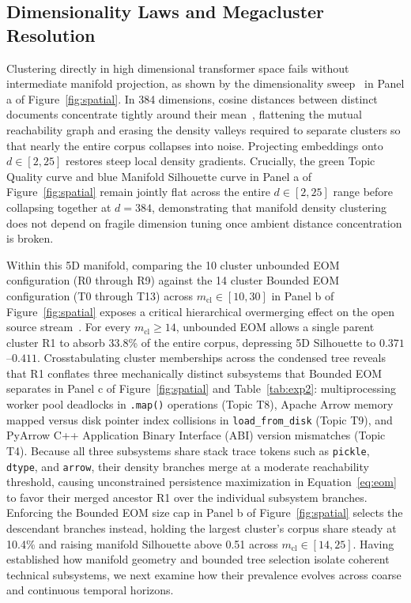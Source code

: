 \documentclass[sigconf,anonymous,pbalance]{acmart}
\begin{document}
\subsection{Dimensionality Laws and Megacluster Resolution}
Clustering directly in high dimensional transformer space fails without intermediate manifold projection, as shown by the dimensionality sweep~\cite{mcinnes2018umap} in Panel a of Figure~\ref{fig:spatial}. In 384 dimensions, cosine distances between distinct documents concentrate tightly around their mean~\cite{beyer1999nearest}, flattening the mutual reachability graph and erasing the density valleys required to separate clusters so that nearly the entire corpus collapses into noise. Projecting embeddings onto $d \in [2, 25]$ restores steep local density gradients. Crucially, the green Topic Quality curve and blue Manifold Silhouette curve in Panel a of Figure~\ref{fig:spatial} remain jointly flat across the entire $d \in [2, 25]$ range before collapsing together at $d = 384$, demonstrating that manifold density clustering does not depend on fragile dimension tuning once ambient distance concentration is broken.

Within this 5D manifold, comparing the 10 cluster unbounded EOM configuration (R0 through R9) against the 14 cluster Bounded EOM configuration (T0 through T13) across $m_{\text{cl}} \in [10, 30]$ in Panel b of Figure~\ref{fig:spatial} exposes a critical hierarchical overmerging effect on the open source stream~\cite{lhoest2021datasets}. For every $m_{\text{cl}} \ge 14$, unbounded EOM allows a single parent cluster R1 to absorb 33.8\% of the entire corpus, depressing 5D Silhouette to $0.371$--$0.411$. Crosstabulating cluster memberships across the condensed tree reveals that R1 conflates three mechanically distinct subsystems that Bounded EOM separates in Panel c of Figure~\ref{fig:spatial} and Table~\ref{tab:exp2}: multiprocessing worker pool deadlocks in \texttt{.map()} operations (Topic T8), Apache Arrow memory mapped versus disk pointer index collisions in \texttt{load\_from\_disk} (Topic T9), and PyArrow C++ Application Binary Interface (ABI) version mismatches (Topic T4). Because all three subsystems share stack trace tokens such as \texttt{pickle}, \texttt{dtype}, and \texttt{arrow}, their density branches merge at a moderate reachability threshold, causing unconstrained persistence maximization in Equation~\ref{eq:eom}~\cite{campello2013density} to favor their merged ancestor R1 over the individual subsystem branches. Enforcing the Bounded EOM size cap in Panel b of Figure~\ref{fig:spatial} selects the descendant branches instead, holding the largest cluster's corpus share steady at 10.4\% and raising manifold Silhouette above 0.51 across $m_{\text{cl}} \in [14, 25]$. Having established how manifold geometry and bounded tree selection isolate coherent technical subsystems, we next examine how their prevalence evolves across coarse and continuous temporal horizons.
\end{document}
